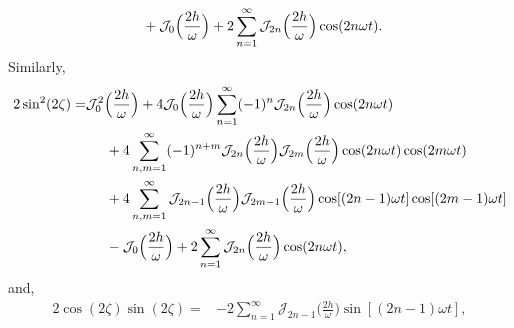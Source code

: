 \documentclass[aps,prb,reprint,showpacs,floatfix,superscriptaddress, onecolumn, nofootinbib, 9pt]{revtex4-2}
\begin{document}
\begin{enumerate}
{\begin{align}
	&\hspace{0.5cm}+\mathcal{J}_0\Big(\frac{2h}{\omega}\Big) + 2 \sum_{n=1}^\infty \mathcal{J}_{2n}\Big(\frac{2h}{\omega}\Big)\cos(2n\omega t).
	\end{align}
	Similarly,
	\begin{align}
	2\sin[2](2\zeta)=& \mathcal{J}^2_0\Big(\frac{2h}{\omega}\Big) + 4\mathcal{J}_0\Big(\frac{2h}{\omega}\Big)\sum_{n=1}^\infty (-1)^n \mathcal{J}_{2n}\Big(\frac{2h}{\omega}\Big)\cos(2n\omega t)\nonumber\\
	&\hspace{0.5cm}+4\sum_{n,m=1}^\infty(-1)^{n+m}\mathcal{J}_{2n}\Big(\frac{2h}{\omega}\Big)\mathcal{J}_{2m}\Big(\frac{2h}{\omega}\Big) \cos(2n\omega t)\cos(2m\omega t)\nonumber\\
	&\hspace{0.5cm}+4 \sum_{n,m=1}^\infty \mathcal{J}_{2n-1}\Big(\frac{2h}{\omega}\Big)\mathcal{J}_{2m-1}\Big(\frac{2h}{\omega}\Big)\cos[(2n-1)\omega t]\cos[(2m-1)\omega t]\nonumber\\
	&\hspace{0.5cm}-\mathcal{J}_0\Big(\frac{2h}{\omega}\Big) + 2 \sum_{n=1}^\infty \mathcal{J}_{2n}\Big(\frac{2h}{\omega}\Big)\cos(2n\omega t),
	\end{align}
	and,
	\begin{align}
	2\cos(2\zeta)\sin(2\zeta)=& -2 \sum_{n=1}^\infty \mathcal{J}_{2n-1}\Big(\frac{2h}{\omega}\Big)\sin[(2n-1)\omega t],
	\end{align}

}
\end{enumerate}
\end{document}
